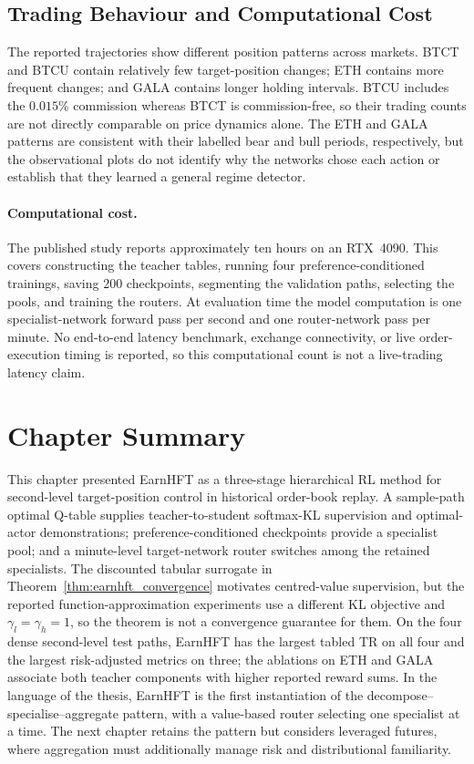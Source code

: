\subsection{Trading Behaviour and Computational Cost}
\label{sec:earnhft_behaviour}

The reported trajectories show different position patterns across markets. BTCT and BTCU contain relatively few target-position changes; ETH contains more frequent changes; and GALA contains longer holding intervals. BTCU includes the $0.015\%$ commission whereas BTCT is commission-free, so their trading counts are not directly comparable on price dynamics alone. The ETH and GALA patterns are consistent with their labelled bear and bull periods, respectively, but the observational plots do not identify why the networks chose each action or establish that they learned a general regime detector.

\paragraph{Computational cost.} The published study reports approximately ten hours on an RTX~4090. This covers constructing the teacher tables, running four preference-conditioned trainings, saving 200 checkpoints, segmenting the validation paths, selecting the pools, and training the routers. At evaluation time the model computation is one specialist-network forward pass per second and one router-network pass per minute. No end-to-end latency benchmark, exchange connectivity, or live order-execution timing is reported, so this computational count is not a live-trading latency claim.

\section{Chapter Summary}
\label{sec:earnhft_summary}

This chapter presented EarnHFT as a three-stage hierarchical RL method for second-level target-position control in historical order-book replay. A sample-path optimal Q-table supplies teacher-to-student softmax-KL supervision and optimal-actor demonstrations; preference-conditioned checkpoints provide a specialist pool; and a minute-level target-network router switches among the retained specialists. The discounted tabular surrogate in Theorem~\ref{thm:earnhft_convergence} motivates centred-value supervision, but the reported function-approximation experiments use a different KL objective and $\gamma_l=\gamma_h=1$, so the theorem is not a convergence guarantee for them. On the four dense second-level test paths, EarnHFT has the largest tabled TR on all four and the largest risk-adjusted metrics on three; the ablations on ETH and GALA associate both teacher components with higher reported reward sums. In the language of the thesis, EarnHFT is the first instantiation of the decompose--specialise--aggregate pattern, with a value-based router selecting one specialist at a time. The next chapter retains the pattern but considers leveraged futures, where aggregation must additionally manage risk and distributional familiarity.

